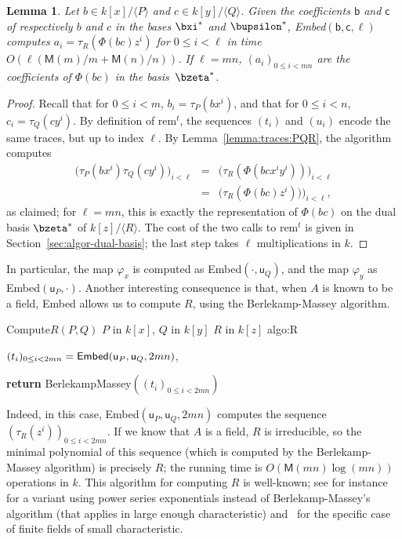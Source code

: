 \documentclass{sig-alternate}
\def\M {\ensuremath{\mathsf{M}}}
\def\vu {\ensuremath{\mathsf{u}}}
\def\vb {\ensuremath{\mathsf{b}}}
\def\vc {\ensuremath{\mathsf{c}}}
\def\rem {\ensuremath{\mathrm{rem}}}
\newcounter{algo}
\newenvironment{algorithm_endline}[4]{\small\begin{center}\begin{minipage}{0.48\textwidth}
      \refstepcounter{algo}
      \label{#4}
      \sf
      \rule{\textwidth}{0.2pt}\\
      \makebox[\textwidth][c]{Algorithm~\arabic{algo}:~\textbf{#1}}\\
      \rule[0.5\baselineskip]{\textwidth}{0.2pt}\\

      \vspace{-12pt}

      \parbox{\textwidth}{\textbf{Input} #2}
      \parbox{\textwidth}{\textbf{Output} #3}

\vspace{-7pt}

      \begin{enumerate*}}{\end{enumerate*}
      \vspace{-11pt}
      \rule{\textwidth}{0.2pt}
\end{minipage}\end{center}
}
\newcommand{\ang}[1]{\langle#1\rangle}
\newtheorem{Lemma}{Lemma}
\begin{document}
\begin{Lemma}\label{lemma:algo:embed}
  Let $b \in k[x]/\ang{P}$ and $c \in k[y]/\ang{Q}$.  Given the
  coefficients $\vb$ and $\vc$ of respectively $b$ and $c$ in the
  bases $\bxi^\ast$ and $\bupsilon^\ast$, {\sf Embed}$(\vb,\vc,\ell)$
  computes $a_i=\tau_R\left(\Phi(bc)z^i\right)$ for $0 \le i < \ell$ in time
  $O(\ell(\M(m)/m+\M(n)/n))$. If $\ell=mn$, $(a_i)_{0 \le i < mn}$ are
  the coefficients of $\Phi(bc)$ in the basis~$\bzeta^\ast$.
\end{Lemma}
\begin{proof}
  Recall that for $0 \le i <m$, $b_i = \tau_P(bx^i)$, and that for $0
  \le i < n$, $c_i = \tau_Q(cy^i)$. By definition of $\rem^t$, the
  sequences $(t_i)$ and $(u_i)$ encode the same traces, but up to
  index $\ell$.  By Lemma~\ref{lemma:traces:PQR}, the algorithm
  computes
  \begin{eqnarray*}
    \bigl(\tau_P(bx^i)\tau_Q(cy^i)\bigr)_{i<\ell} &=&  \bigl(\tau_R(\Phi(bc x^i y^i))\bigr)_{i<\ell}\\
    &=&  \bigl(\tau_R(\Phi(bc) z^i))\bigr)_{i<\ell},
  \end{eqnarray*}
  as claimed; for $\ell=mn$, this is exactly the representation of
  $\Phi(bc)$ on the dual basis $\bzeta^\ast$ of $k[z]/\ang{R}$. The
  cost of the two calls to $\rem^t$ is given in
  Section~\ref{sec:algor-dual-basis}; the last step takes $\ell$
  multiplications in $k$.
\end{proof}

In particular, the map $\varphi_x$ is computed as
{\sf Embed}$(\cdot,\vu_Q)$, and the map $\varphi_y$ as
{\sf Embed}$(\vu_P,\cdot)$. Another interesting consequence is that, when
$A$ is known to be a field, {\sf Embed} allows us to compute $R$, using the
Berlekamp-Massey algorithm.

\vspace{-2ex}

\begin{algorithm_endline}
{Compute$R(P,Q)$}
{$P$ in $k[x]$, $Q$ in $k[y]$}
{$R$ in $k[z]$}
{algo:R}
\item $(t_i)_{0 \le i < 2mn}={\sf Embed}(\vu_P,\vu_Q,2mn)$,
\item {\bf return} BerlekampMassey$((t_i)_{0 \le i < 2mn})$
\end{algorithm_endline}

Indeed, in this case, {\sf Embed}$(\vu_P,\vu_Q,2mn)$ computes the sequence
$(\tau_R(z^i))_{0\le i < 2mn}$. If we know that $A$ is a field, $R$ is
irreducible, so the minimal polynomial of this sequence (which is
computed by the Berlekamp-Massey algorithm) is precisely $R$; the
running time is $O(\M(mn)\log(mn))$ operations in $k$. This algorithm
for computing $R$ is well-known; see for instance~\cite{BoFlSaSc06}
for a variant using power series exponentials instead of
Berlekamp-Massey's algorithm (that applies in large enough
characteristic) and~\cite{BGPS05} for the specific case of finite
fields of small characteristic.
\end{document}
